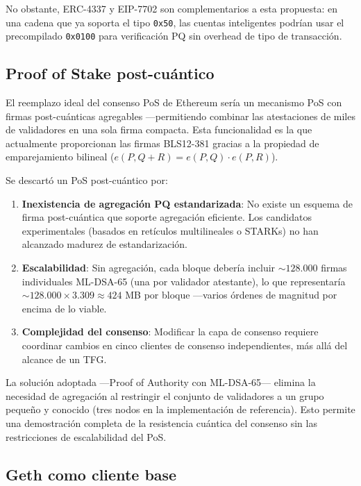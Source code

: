 No obstante, ERC-4337 y EIP-7702 son complementarios a esta propuesta: en una cadena que ya soporta el tipo \texttt{0x50}, las cuentas inteligentes podrían usar el precompilado \texttt{0x0100} para verificación PQ sin overhead de tipo de transacción.

\subsection{Proof of Stake post-cuántico}
\label{sec:pos_pq}

El reemplazo ideal del consenso PoS de Ethereum sería un mecanismo PoS con firmas post-cuánticas agregables ---permitiendo combinar las atestaciones de miles de validadores en una sola firma compacta. Esta funcionalidad es la que actualmente proporcionan las firmas BLS12-381 gracias a la propiedad de emparejamiento bilineal ($e(P, Q+R) = e(P, Q) \cdot e(P, R)$).

Se descartó un PoS post-cuántico por:

\begin{enumerate}
  \item \textbf{Inexistencia de agregación PQ estandarizada}: No existe un esquema de firma post-cuántica que soporte agregación eficiente. Los candidatos experimentales (basados en retículos multilineales o STARKs) no han alcanzado madurez de estandarización.
  
  \item \textbf{Escalabilidad}: Sin agregación, cada bloque debería incluir ${\sim}128.000$ firmas individuales ML-DSA-65 (una por validador atestante), lo que representaría ${\sim}128.000 \times 3.309 \approx 424$ MB por bloque ---varios órdenes de magnitud por encima de lo viable.
  
  \item \textbf{Complejidad del consenso}: Modificar la capa de consenso requiere coordinar cambios en cinco clientes de consenso independientes, más allá del alcance de un TFG.
\end{enumerate}

La solución adoptada ---Proof of Authority con ML-DSA-65--- elimina la necesidad de agregación al restringir el conjunto de validadores a un grupo pequeño y conocido (tres nodos en la implementación de referencia). Esto permite una demostración completa de la resistencia cuántica del consenso sin las restricciones de escalabilidad del PoS.

\subsection{Geth como cliente base}


